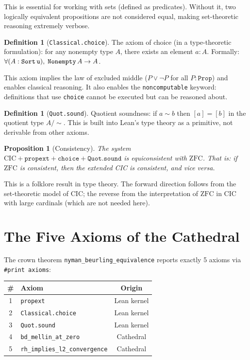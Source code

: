 \documentclass[11pt,a4paper]{article}
\theoremstyle{plain}
\newtheorem{proposition}[theorem]{Proposition}
\theoremstyle{definition}
\newtheorem{definition}[theorem]{Definition}
\newcommand{\lean}[1]{\texttt{#1}}
\newcommand{\CIC}{\mathrm{CIC}}
\newcommand{\ZFC}{\mathrm{ZFC}}
\begin{document}
This is essential for working with sets (defined as predicates).
Without it, two logically equivalent propositions are not considered
equal, making set-theoretic reasoning extremely verbose.

\begin{definition}[\lean{Classical.choice}]
The axiom of choice (in a type-theoretic formulation): for any
nonempty type $A$, there exists an element $a : A$. Formally:
$\forall (A : \lean{Sort\,u}),\; \lean{Nonempty}\,A \to A$.
\end{definition}

This axiom implies the law of excluded middle ($P \lor \neg P$ for
all $P : \lean{Prop}$) and enables classical reasoning. It also
enables the \lean{noncomputable} keyword: definitions that use
\lean{choice} cannot be executed but can be reasoned about.

\begin{definition}[\lean{Quot.sound}]
Quotient soundness: if $a \sim b$ then $[a] = [b]$ in the quotient
type $A / \sim$. This is built into Lean's type theory as a
primitive, not derivable from other axioms.
\end{definition}

\begin{proposition}[Consistency]
\label{prop:consistency}
The system $\CIC + \lean{propext} + \lean{choice} + \lean{Quot.sound}$
is equiconsistent with $\ZFC$. That is: if $\ZFC$ is consistent,
then the extended CIC is consistent, and vice versa.
\end{proposition}

This is a folklore result in type theory. The forward direction
follows from the set-theoretic model of CIC; the reverse from
the interpretation of $\ZFC$ in CIC with large cardinals
(which are not needed here).

\section{The Five Axioms of the Cathedral}
\label{sec:axioms}

The crown theorem \lean{nyman\_beurling\_equivalence} reports exactly
5 axioms via \lean{\#print axioms}:

\begin{center}
\begin{tabular}{@{}clc@{}}
\toprule
\textbf{\#} & \textbf{Axiom} & \textbf{Origin} \\
\midrule
1 & \lean{propext} & Lean kernel \\
2 & \lean{Classical.choice} & Lean kernel \\
3 & \lean{Quot.sound} & Lean kernel \\
4 & \lean{bd\_mellin\_at\_zero} & Cathedral \\
5 & \lean{rh\_implies\_l2\_convergence} & Cathedral \\
\bottomrule
\end{tabular}
\end{center}
\end{document}
